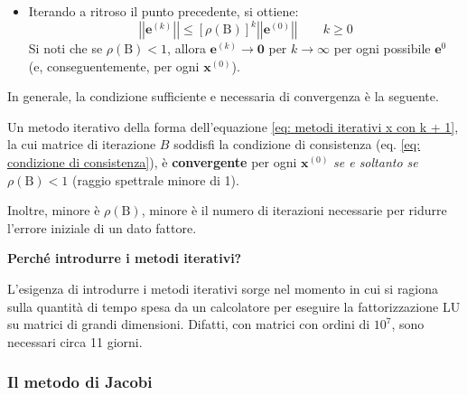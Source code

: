 \begin{itemize}
\begin{itemize}
        \item Iterando a ritroso il punto precedente, si ottiene:
        \begin{equation}
            \left|\left| \mathbf{e}^{\left(k\right)} \right|\right| 
            \le
            \left[\rho\left(\mathrm{B}\right)\right]^{k}
            \left|\left| \mathbf{e}^{\left(0\right)} \right|\right| 
            \hspace{2em}
            k \ge 0
        \end{equation}
        Si noti che se $\rho\left(\mathrm{B}\right) < 1$, allora $\mathbf{e}^{\left(k\right)} \rightarrow \mathbf{0}$ per $k \rightarrow \infty$ per ogni possibile $\mathbf{e}^{0}$ (e, conseguentemente, per ogni $\mathbf{x}^{\left(0\right)}$).
    \end{itemize}
\end{itemize}
In generale, la condizione sufficiente e necessaria di convergenza è la seguente.

\begin{definitionbox}
    Un metodo iterativo della forma dell'equazione \ref{eq: metodi iterativi x con k + 1}, la cui matrice di iterazione $B$ soddisfi la condizione di consistenza (eq. \ref{eq: condizione di consistenza}), è \textbf{convergente} per ogni $\mathbf{x}^{\left(0\right)}$ \emph{se e soltanto se} $\rho\left(\mathrm{B}\right) < 1$ (raggio spettrale minore di 1).

    \highspace
    Inoltre, minore è $\rho\left(\mathrm{B}\right)$, minore è il numero di iterazioni necessarie per ridurre l'errore iniziale di un dato fattore.
\end{definitionbox}

\highspace
\begin{flushleft}
    \textcolor{Green3}{ \textbf{Perché introdurre i metodi iterativi?}}
\end{flushleft}
L'esigenza di introdurre i metodi iterativi sorge nel momento in cui si ragiona sulla quantità di tempo spesa da un calcolatore per eseguire la fattorizzazione LU su matrici di grandi dimensioni. Difatti, con matrici con ordini di $10^{7}$, sono necessari circa 11 giorni.

\newpage

\subsubsection{Il metodo di Jacobi}

